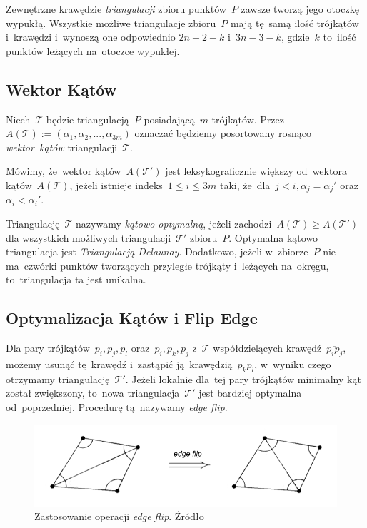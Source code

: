 \documentclass[skorowidz,autorrok,backref,xodstep,oswiadczenie]{wmimgr}
\begin{document}
Zewnętrzne krawędzie \emph{triangulacji} zbioru punktów~$P$ zawsze tworzą jego otoczkę wypukłą. Wszystkie możliwe triangulacje zbioru~$P$ mają tę~samą ilość trójkątów i~krawędzi i~wynoszą one odpowiednio $2n-2-k$ i~$3n-3-k$, gdzie~$k$ to~ilość punktów leżących na~otoczce wypukłej.

\subsection{Wektor Kątów}

Niech~$\mathcal{T}$ będzie triangulacją~$P$ posiadającą~$m$ trójkątów. Przez~$A(\mathcal{T}) := (\alpha_{1}, \alpha_{2}, ..., \alpha_{3m})$ oznaczać będziemy posortowany rosnąco \emph{wektor~kątów} triangulacji~$\mathcal{T}$.

Mówimy, że~wektor kątów~$A(\mathcal{T'})$ jest leksykograficznie większy od~wektora kątów~$A(\mathcal{T})$, jeżeli istnieje indeks~$1 \leq i \leq 3m$ taki, że~dla~$j < i, \alpha_{j} = \alpha_{j}'$ oraz~$\alpha_{i} < \alpha_{i}'$.

Triangulację~$\mathcal{T}$ nazywamy \emph{kątowo optymalną}, jeżeli zachodzi~$A(\mathcal{T}) \geq A(\mathcal{T'})$ dla wszystkich możliwych triangulacji~$\mathcal{T'}$ zbioru~$P$. Optymalna kątowo triangulacja jest \emph{Triangulacją Delaunay}. Dodatkowo, jeżeli w~zbiorze~$P$ nie ma~czwórki punktów tworzących przyległe trójkąty i~leżących na~okręgu, to~triangulacja ta jest unikalna.

\subsection{Optymalizacja Kątów i Flip Edge}

Dla pary trójkątów~$p_{i}, p_{j}, p_{l}$ oraz~$p_{i}, p_{k}, p_{j}$ z~$\mathcal{T}$ współdzielących krawędź~$\overline{p_{i} p_{j}}$, możemy usunąć tę~krawędź i~zastąpić ją~krawędzią~$\overline{p_{k} p_{l}}$, w~wyniku czego otrzymamy triangulację~$\mathcal{T'}$. Jeżeli lokalnie dla~tej pary trójkątów minimalny kąt został zwiększony, to~nowa triangulacja~$\mathcal{T'}$ jest bardziej optymalna od~poprzedniej. Procedurę tą~nazywamy \emph{edge flip}.

\begin{figure}[ht!]
\centering
\includegraphics[width=150mm]{images/triangulacja2.png}
\caption{Zastosowanie operacji \emph{edge flip}. Źródło \cite{geometria}}
\label{edgeflip}
\end{figure}
\end{document}
